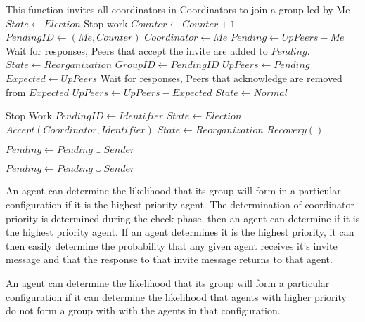 \begin{algorithmic}[1]
\small
{}
    \State This function invites all coordinators in Coordinators to join a group led by Me
    \State $State \gets Election$
    \State Stop work
    \State $Counter \gets Counter+1$
    \State $PendingID \gets (Me,Counter)$
    \State $Coordinator \gets Me$
    \State $Pending \gets UpPeers - {Me}$
    \EndFor
    \State Wait for responses, Peers that accept the invite are added to $Pending$.
    \State $State \gets Reorganization$
	\State $GroupID \gets PendingID$
	\State $UpPeers \gets Pending$
    \EndFor
    \State $Expected \gets UpPeers$
    \State Wait for responses, Peers that acknowledge are removed from $Expected$
    \State $UpPeers \gets UpPeers - Expected$
    \State $State \gets Normal$
\EndFunction

        \Return
    \EndIf
        \Return
    \EndIf
    \State Stop Work
    \State $PendingID \gets Identifier$
    \State $State \gets Election$
    \State $Accept(Coordinator,Identifier)$
    \State $State \gets Reorganization$
        \State $Recovery()$
    \EndIf
\EndFunction

        \State $Pending \gets Pending \cup {Sender}$
    \EndIf
\EndFunction

    \State $Pending \gets Pending \cup {Sender}$
\EndFunction

\end{algorithmic}

An agent can determine the likelihood that its group will form in a particular configuration if it is the highest priority agent. The determination of coordinator priority is determined during the check phase, then an agent can determine if it is the highest priority agent. If an agent determines it is the highest priority, it can then easily determine the probability that any given agent receives it's invite message and that the response to that invite message returns to that agent.

An agent can determine the likelihood that its group will form a particular configuration if it can determine the likelihood that agents with higher priority do not form a group with with the agents in that configuration.

